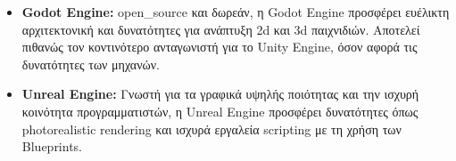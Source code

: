 \begin{itemize}
    \item \textbf{Godot Engine\cite{engine_godot_nodate}:} \Gls{open_source} και δωρεάν, η Godot Engine προσφέρει ευέλικτη αρχιτεκτονική και δυνατότητες για ανάπτυξη \acrshort{2d} και \acrshort{3d} παιχνιδιών. Αποτελεί πιθανώς τον κοντινότερο ανταγωνιστή για το Unity Engine, όσον αφορά τις δυνατότητες των μηχανών.
    \item \textbf{Unreal Engine\cite{noauthor_most_nodate}:} Γνωστή για τα γραφικά υψηλής ποιότητας και την ισχυρή κοινότητα προγραμματιστών, η Unreal Engine προσφέρει δυνατότητες όπως \gls{photorealistic} \gls{rendering} και ισχυρά εργαλεία scripting με τη χρήση των Blueprints.
\end{itemize}
